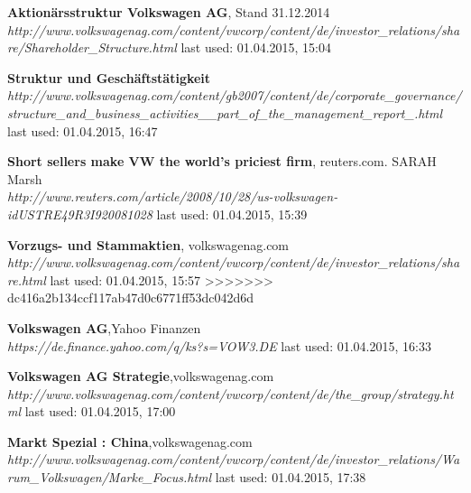 \documentclass[12pt]{article}
\begin{document}
\begin{thebibliography}{56}
    
  \textbf{Aktionärsstruktur Volkswagen AG}, Stand 31.12.2014 \\
  \textit{http://www.volkswagenag.com/content/vwcorp/content/de/investor\_relations/share/Shareholder\_Structure.html}
  \newline last used: 01.04.2015, 15:04
    
  \textbf{Struktur und Geschäftstätigkeit}\\
  \textit{http://www.volkswagenag.com/content/gb2007/content/de/corporate\_governance/structure\_and\_business\_activities\_\_part\_of\_the\_management\_report\_.html}
  \newline last used: 01.04.2015, 16:47
  
 \textbf{Short sellers make VW the world's priciest firm}, reuters.com. SARAH Marsh \\
  \textit{  http://www.reuters.com/article/2008/10/28/us-volkswagen-idUSTRE49R3I920081028}
  \newline last used: 01.04.2015, 15:39  
  
 \textbf{Vorzugs- und Stammaktien}, volkswagenag.com \\
  \textit{   http://www.volkswagenag.com/content/vwcorp/content/de/investor\_relations/share.html}
  \newline last used: 01.04.2015, 15:57  
>>>>>>> dc416a2b134ccf117ab47d0c6771ff53dc042d6d
  
 \textbf{Volkswagen AG},Yahoo Finanzen \\
  \textit{  https://de.finance.yahoo.com/q/ks?s=VOW3.DE}
  \newline last used: 01.04.2015, 16:33  
  
 \textbf{Volkswagen AG Strategie},volkswagenag.com \\
  \textit{http://www.volkswagenag.com/content/vwcorp/content/de/the\_group/strategy.html}
  \newline last used: 01.04.2015, 17:00  
    
 \textbf{Markt Spezial : China},volkswagenag.com \\
  \textit{http://www.volkswagenag.com/content/vwcorp/content/de/investor\_relations/Warum\_Volkswagen/Marke\_Focus.html
}
  \newline last used: 01.04.2015, 17:38
\end{thebibliography}
\end{document}
